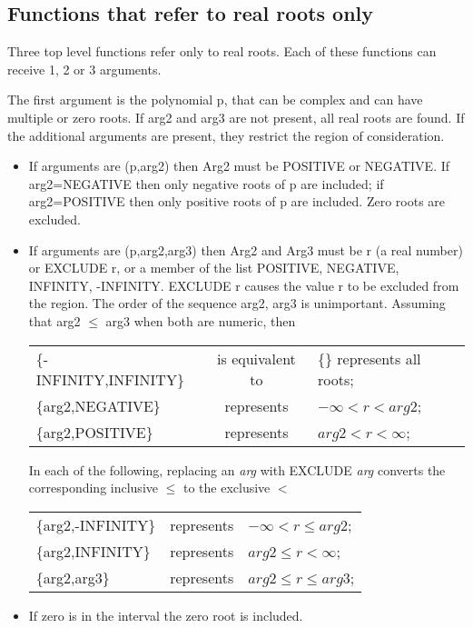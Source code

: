 \subsection{Functions that refer to real roots only}

Three top level functions refer only to real roots.  Each of these
functions can receive 1, 2 or 3 arguments.

The first argument is the polynomial p, that can be complex and can
have multiple or zero roots.  If arg2 and arg3 are not present, all real
roots are found.  If the additional arguments are present, they restrict
the region of consideration.

\begin{itemize}
\item If arguments are (p,arg2) then
Arg2 must be POSITIVE or NEGATIVE.  If arg2=NEGATIVE then only
negative roots of p are included; if arg2=POSITIVE then only positive
roots of p are included. Zero roots are excluded.

\item If arguments are (p,arg2,arg3) then
   
Arg2 and Arg3 must be r (a real number) or  EXCLUDE r,  or a member of
the list POSITIVE, NEGATIVE, INFINITY, -INFINITY.  EXCLUDE r causes the
value r to be excluded from the region.  The order of the sequence
arg2, arg3 is unimportant.  Assuming that arg2 $\leq$ arg3 when both are
numeric, then

\begin{tabular}{l c l}
\{-INFINITY,INFINITY\} & is equivalent to & \{\} represents all roots; \\
\{arg2,NEGATIVE\} & represents & $-\infty < r < arg2$; \\
\{arg2,POSITIVE\} & represents & $arg2 < r < \infty$;
\end{tabular}

In each of the following, replacing an {\em arg} with EXCLUDE {\em arg}
converts the corresponding inclusive $\leq$ to the exclusive $<$

\begin{tabular}{l c l}
\{arg2,-INFINITY\} & represents & $-\infty < r \leq arg2$; \\
\{arg2,INFINITY\} & represents & $arg2 \leq r < \infty$; \\
\{arg2,arg3\} & represents & $arg2 \leq r \leq arg3$;
\end{tabular}

\item If zero is in the interval the zero root is included.
\end{itemize}

